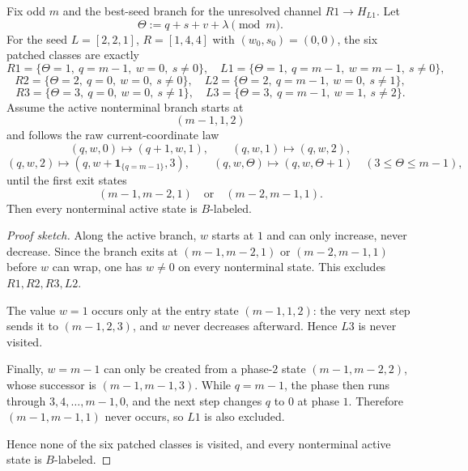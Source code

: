\begin{proposition}
Fix odd $m$ and the best-seed branch for the unresolved channel $R1\to H_{L1}$. Let
\[
\Theta:=q+s+v+\lambda \pmod m.
\]
For the seed $L=[2,2,1]$, $R=[1,4,4]$ with $(w_0,s_0)=(0,0)$, the six patched classes are exactly
\[
R1 = \{\Theta=1,\ q=m-1,\ w=0,\ s\neq 0\},
\quad
L1 = \{\Theta=1,\ q=m-1,\ w=m-1,\ s\neq 0\},
\]
\[
R2 = \{\Theta=2,\ q=0,\ w=0,\ s\neq 0\},
\quad
L2 = \{\Theta=2,\ q=m-1,\ w=0,\ s\neq 1\},
\]
\[
R3 = \{\Theta=3,\ q=0,\ w=0,\ s\neq 1\},
\quad
L3 = \{\Theta=3,\ q=m-1,\ w=1,\ s\neq 2\}.
\]
Assume the active nonterminal branch starts at
\[
(m-1,1,2)
\]
and follows the raw current-coordinate law
\[
(q,w,0)\mapsto(q+1,w,1),
\qquad
(q,w,1)\mapsto(q,w,2),
\]
\[
(q,w,2)\mapsto(q,w+\mathbf 1_{\{q=m-1\}},3),
\qquad
(q,w,\Theta)\mapsto(q,w,\Theta+1)
\quad (3\le \Theta\le m-1),
\]
until the first exit states
\[
(m-1,m-2,1) \quad \text{or} \quad (m-2,m-1,1).
\]
Then every nonterminal active state is $B$-labeled.
\end{proposition}

\begin{proof}[Proof sketch]
Along the active branch, $w$ starts at $1$ and can only increase, never decrease. Since the branch exits at $(m-1,m-2,1)$ or $(m-2,m-1,1)$ before $w$ can wrap, one has $w\neq 0$ on every nonterminal state. This excludes $R1,R2,R3,L2$.

The value $w=1$ occurs only at the entry state $(m-1,1,2)$: the very next step sends it to $(m-1,2,3)$, and $w$ never decreases afterward. Hence $L3$ is never visited.

Finally, $w=m-1$ can only be created from a phase-$2$ state $(m-1,m-2,2)$, whose successor is $(m-1,m-1,3)$. While $q=m-1$, the phase then runs through $3,4,\dots,m-1,0$, and the next step changes $q$ to $0$ at phase $1$. Therefore $(m-1,m-1,1)$ never occurs, so $L1$ is also excluded.

Hence none of the six patched classes is visited, and every nonterminal active state is $B$-labeled.\qedhere
\end{proof}

